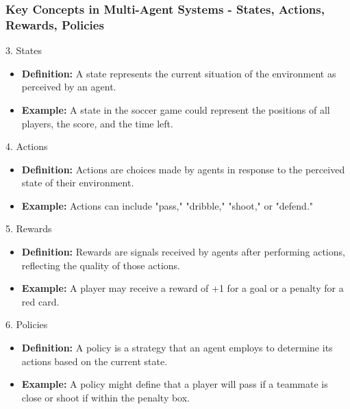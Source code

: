 \documentclass[aspectratio=169]{beamer}
\begin{document}
\begin{frame}[fragile]
    \frametitle{Key Concepts in Multi-Agent Systems - States, Actions, Rewards, Policies}
    \begin{block}{3. States}
        \begin{itemize}
            \item \textbf{Definition:} A state represents the current situation of the environment as perceived by an agent.
            \item \textbf{Example:} A state in the soccer game could represent the positions of all players, the score, and the time left.
        \end{itemize}
    \end{block}
    
    \begin{block}{4. Actions}
        \begin{itemize}
            \item \textbf{Definition:} Actions are choices made by agents in response to the perceived state of their environment.
            \item \textbf{Example:} Actions can include "pass," "dribble," "shoot," or "defend."
        \end{itemize}
    \end{block}

    \begin{block}{5. Rewards}
        \begin{itemize}
            \item \textbf{Definition:} Rewards are signals received by agents after performing actions, reflecting the quality of those actions.
            \item \textbf{Example:} A player may receive a reward of +1 for a goal or a penalty for a red card.
        \end{itemize}
    \end{block}

    \begin{block}{6. Policies}
        \begin{itemize}
            \item \textbf{Definition:} A policy is a strategy that an agent employs to determine its actions based on the current state.
            \item \textbf{Example:} A policy might define that a player will pass if a teammate is close or shoot if within the penalty box.
        \end{itemize}
    \end{block}
\end{frame}
\end{document}
